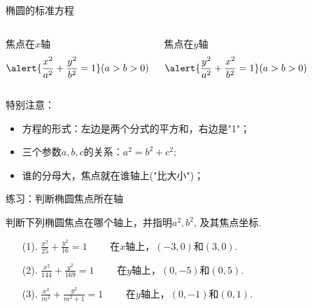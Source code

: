 \documentclass{beamer}
\begin{document}
    \begin{frame}{\qquad 椭圆的标准方程}
      \begin{columns}
        \begin{alertblock}{焦点在$ x $轴}
          \[ \alert{\frac{x^2}{a^2} + \frac{y^2}{b^2} = 1}(a>b>0) \]
        \end{alertblock}
        \begin{alertblock}{焦点在$ y $轴}
          \[ \alert{\frac{y^2}{a^2} + \frac{x^2}{b^2} = 1}(a>b>0) \]
        \end{alertblock}
      \end{columns}
      \begin{exampleblock}{特别注意：}
        \begin{itemize}
          \item 方程的形式：\pause 左边是两个分式的平方和，右边是"1"；\pause
          \item 三个参数$a,b,c$的关系：\pause \alert{$a^2=b^2+c^2$}; \pause
          \item 谁的分母大，焦点就在谁轴上("比大小")；
        \end{itemize}
      \end{exampleblock}
    \end{frame}

    \begin{frame}{\qquad 练习：判断椭圆焦点所在轴}

      判断下列椭圆焦点在哪个轴上，并指明$a^2,b^2$, 及其焦点坐标.

      \begin{enumerate}
        \item[(1).] $\frac{x^2}{25} + \frac{y^2}{16} = 1 \qquad$ \pause \textcolor{rh}{在$x$轴上，\pause $(-3,0)$和$(3,0)$. }
        \item[(2).] $\frac{x^2}{144} + \frac{y^2}{169} = 1 \qquad$ \pause \textcolor{rh}{在$y$轴上，\pause $(0,-5)$和$(0,5)$. }
        \item[(3).] $\frac{x^2}{m^2} + \frac{y^2}{m^2+1} = 1 \qquad$ \pause \textcolor{rh}{在$y$轴上，\pause $(0,-1)$和$(0,1)$. }
      \end{enumerate}

    \end{frame}

\end{document}
